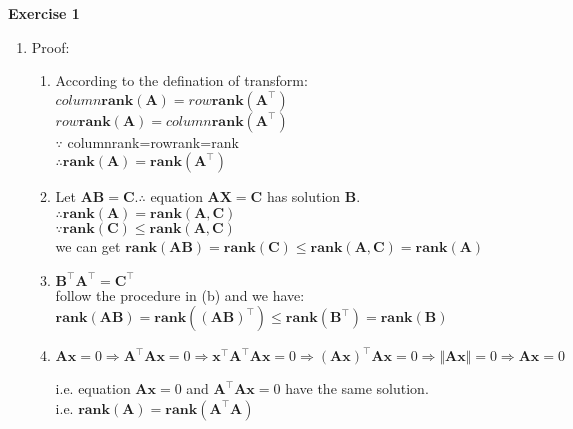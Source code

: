 \documentclass[11pt,letter,notitlepage]{article}
\newcommand{\rank}[1]{ \textbf{rank}  (#1)  }
\begin{document}
\begin{solution}
    \textbf{Exercise 1}
    \begin{enumerate}
        \item Proof:
        \begin{enumerate}
            \item 
                According to the defination of transform:\\
                $column\rank{\mathbf{A}} = row\rank{\mathbf{A^{\top}}}$\\
                $row\rank{\mathbf{A}} = column\rank{\mathbf{A^{\top}}}$\\
                $\because$ columnrank=rowrank=rank \\
                $\therefore \rank{\mathbf{A}}=\rank{\mathbf{A^{\top}}}$
            \item 
                Let $\mathbf{AB}=\mathbf{C}. \therefore$ equation $\mathbf{AX}=\mathbf{C}$ has solution $\mathbf{B}$.\\
                $\therefore \rank{\mathbf{A}}=\rank{\mathbf{A,C}}$\\
                $\because \rank{\mathbf{C}}\leqslant\rank{\mathbf{A,C}}$\\
                we can get $\rank{\mathbf{AB}}=\rank{\mathbf{C}}\leqslant\rank{\mathbf{A,C}}=\rank{\mathbf{A}}$
            \item 
                $\mathbf{B^{\top}A^{\top}}=\mathbf{C^{\top}}$\\
                follow the procedure in (b) and we have:\\
                $\rank{\mathbf{AB}}=\rank{\mathbf{(AB)^{\top}}}\leqslant\rank{\mathbf{B^{\top}}}=\rank{\mathbf{B}}$
            \item 
                $\mathbf{Ax}=0 
                \Rightarrow \mathbf{A^{\top}Ax}=0
                \Rightarrow \mathbf{x^{\top}A^{\top}Ax}=0
                \Rightarrow \mathbf{(Ax)^{\top}Ax}=0
                \Rightarrow \Vert\mathbf{Ax}\Vert=0
                \Rightarrow \mathbf{Ax}=0$\par
                i.e. equation $\mathbf{Ax}=0$ and $\mathbf{A}^{\top}\mathbf{Ax}=0$ have the same solution.\\
                i.e. $\rank{\mathbf{A}}=\rank{\mathbf{A^{\top}A}}$\\
        \end{enumerate}
        

\end{enumerate}
\end{solution}
\end{document}

